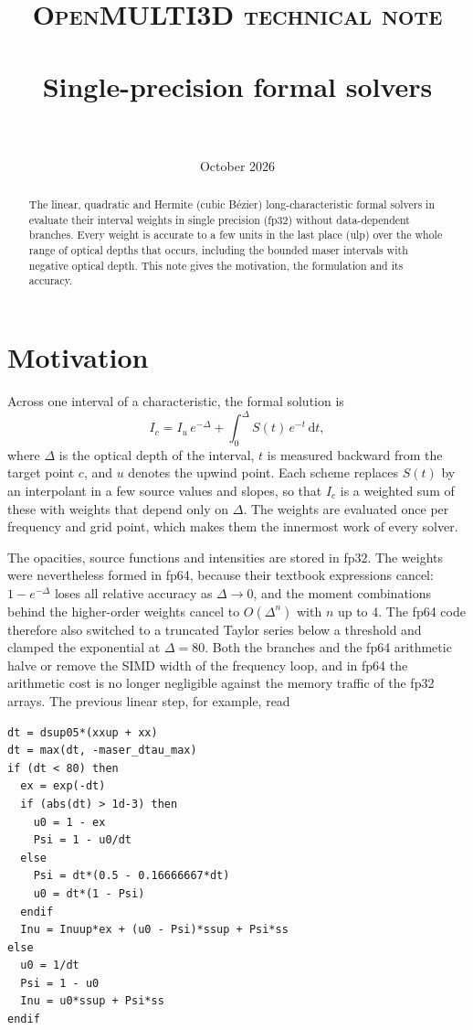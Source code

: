 \documentclass[paper=a4, fontsize=11pt]{scrartcl}
\title{
  \normalfont \normalsize \textsc{OpenMULTI3D technical note} \\ [25pt]
  \horrule{0.5pt} \\[0.4cm]
  \Large Single-precision formal solvers \\
  \horrule{2pt} \\[0.5cm]
}
\author{\normalfont \normalsize October 2026}
\date{}
\numberwithin{equation}{section}
\numberwithin{table}{section}
\newcommand{\filecolor}{\color{NavyBlue}}
\newcommand{\brk}[1]{\leavevmode\begingroup\ttfamily
  \def\_{\textunderscore\allowbreak}%
  \StrSubstitute{#1}{/}{/\allowbreak}[\brkA]%
  \StrSubstitute{\brkA}{.}{.\allowbreak}[\brkA]%
  \brkA\endgroup}
\newcommand{\File}[1]{\leavevmode{\filecolor\brk{#1}}}
\begin{document}
\maketitle

\begin{abstract}
The linear, quadratic and Hermite (cubic B\'ezier) long-characteristic formal
solvers in \File{SRC/rt\_solvers\_mod.f90} evaluate their interval weights in
single precision (fp32) without data-dependent branches. Every weight is
accurate to a few units in the last place (ulp) over the whole range of optical
depths that occurs, including the bounded maser intervals with negative optical
depth. This note gives the motivation, the formulation and its accuracy.
\end{abstract}

\section{Motivation}

Across one interval of a characteristic, the formal solution is
\begin{equation}
  I_c = I_u\, e^{-\Delta} + \int_0^{\Delta} S(t)\, e^{-t}\, \mathrm{d}t ,
  \label{eq:formal}
\end{equation}
where $\Delta$ is the optical depth of the interval, $t$ is measured backward
from the target point $c$, and $u$ denotes the upwind point. Each scheme
replaces $S(t)$ by an interpolant in a few source values and slopes, so that
$I_c$ is a weighted sum of these with weights that depend only on $\Delta$.
The weights are evaluated once per frequency and grid point, which makes them
the innermost work of every solver.

The opacities, source functions and intensities are stored in fp32. The
weights were nevertheless formed in fp64, because their textbook expressions
cancel: $1-e^{-\Delta}$ loses all relative accuracy as $\Delta\to0$, and the
moment combinations behind the higher-order weights cancel to
$O(\Delta^{n})$ with $n$ up to 4. The fp64 code therefore also switched to a
truncated Taylor series below a threshold and clamped the exponential at
$\Delta=80$. Both the branches and the fp64 arithmetic halve or remove the SIMD
width of the frequency loop, and in fp64 the arithmetic cost is no longer
negligible against the memory traffic of the fp32 arrays. The previous linear
step, for example, read

\begin{verbatim}
dt = dsup05*(xxup + xx)
dt = max(dt, -maser_dtau_max)
if (dt < 80) then
  ex = exp(-dt)
  if (abs(dt) > 1d-3) then
    u0 = 1 - ex
    Psi = 1 - u0/dt
  else
    Psi = dt*(0.5 - 0.16666667*dt)
    u0 = dt*(1 - Psi)
  endif
  Inu = Inuup*ex + (u0 - Psi)*ssup + Psi*ss
else
  u0 = 1/dt
  Psi = 1 - u0
  Inu = u0*ssup + Psi*ss
endif
\end{verbatim}
\end{document}
